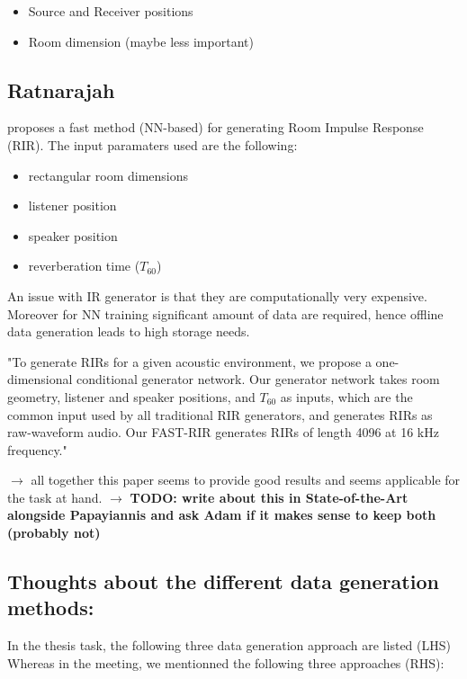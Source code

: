 \documentclass{article}
\begin{document}
\begin{itemize}
    \item Source and Receiver positions 
    \item Room dimension (maybe less important)
\end{itemize}


\subsection{Ratnarajah}

\cite{ratnarajah2021fast} proposes a fast method (NN-based) for generating Room Impulse Response (RIR). The input paramaters used are the following:

\begin{itemize}
    \item rectangular room dimensions
    \item listener position
    \item speaker position
    \item reverberation time ($T_{60}$)
\end{itemize}

An issue with IR generator is that they are computationally very expensive. Moreover for NN training significant amount of data are required, hence offline data generation leads to high storage needs.

"To generate RIRs for a given acoustic environment, we propose a one-dimensional conditional generator network. Our generator network takes room geometry, listener and speaker positions, and $T_{60}$ as inputs, which are the common input used by all traditional RIR generators, and generates RIRs as raw-waveform audio. Our FAST-RIR generates RIRs of length 4096 at 16 kHz frequency."

$\rightarrow$ all together this paper seems to provide good results and seems applicable for the task at hand. $\rightarrow$ \textbf{TODO: write about this in State-of-the-Art alongside Papayiannis and ask Adam if it makes sense to keep both (probably not)} 


\subsection{Thoughts about the different data generation methods:}

In the thesis task, the following three data generation approach are listed (LHS) Whereas in the meeting, we mentionned the following three approaches (RHS):
\end{document}

